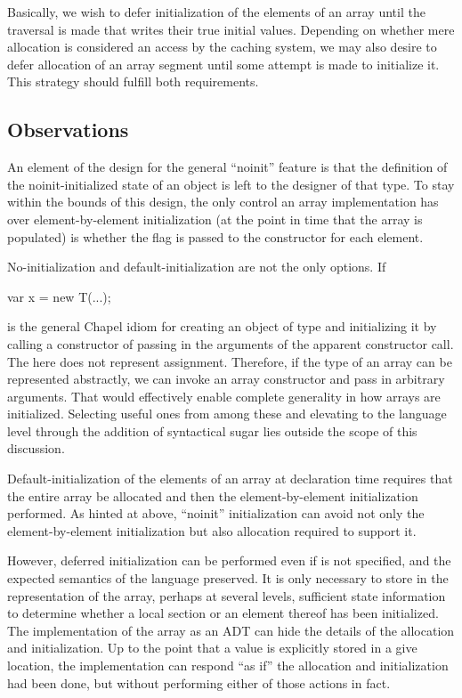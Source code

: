 Basically, we wish to defer initialization of the elements of an array until the traversal
is made that writes their true initial values.  Depending on whether mere allocation is
considered an access by the caching system, we may also desire to defer allocation of an
array segment until some attempt is made to initialize it.  This strategy should fulfill both
requirements.

\subsection{Observations}

An element of the design for the general ``noinit'' feature is that the definition of the
noinit-initialized state of an object is left to the designer of that type.  To stay
within the bounds of this design, the only control an array implementation has over
element-by-element initialization (at the point in time that the array is populated) is
whether the  flag is passed to the constructor for each element.  

No-initialization and default-initialization are not the only options.  If
\begin{chapel}
var x = new T(...);
\end{chapel}
is the general Chapel idiom for creating an object  of type  and
initializing it by calling a constructor of  passing in the arguments of the
apparent constructor call.  The \chpl{=} here does not represent assignment.  Therefore,
if the type of an array can be represented abstractly, we can invoke an array constructor and
pass in arbitrary arguments.  That would effectively enable complete generality in how
arrays are initialized.  Selecting useful ones from among these and elevating to the
language level through the addition of syntactical sugar lies outside the scope of this
discussion.

Default-initialization of the elements of an array at declaration time requires that the
entire array be allocated and then the element-by-element initialization performed.
As hinted at above, ``noinit'' initialization can avoid not only the element-by-element
initialization but also allocation required to support it.

However, deferred initialization can be performed even if  is not specified,
and the expected semantics of the language preserved.  It is only necessary to store in
the representation of the array, perhaps at several levels, sufficient state information
to determine whether a local section or an element thereof has been initialized.  The
implementation of the array as an ADT can hide the details of the allocation and
initialization.  Up to the point that a value is explicitly stored in a give location, the
implementation can respond ``as if'' the allocation and initialization had been done, but
without performing either of those actions in fact.

